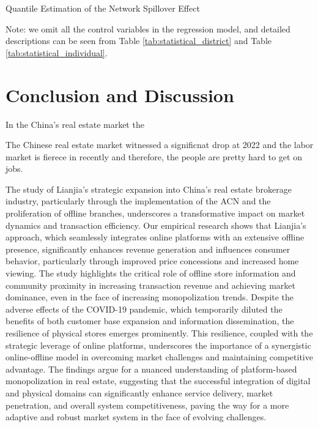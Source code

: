 \documentclass[11pt]{article}
\begin{document}
\begin{table}
  \begin{center}
    \begin{scriptsize}
      \caption{Quantile Estimation of the Network Spillover Effect}
      \label{tab:quantile_estimate_network}
      
    
    Note: we omit all the control variables in the regression model, and detailed descriptions can be seen from Table \ref{tab:statistical_district} and Table \ref{tab:statistical_individual}.
    \end{scriptsize}
  \end{center}
\end{table}


















\section{Conclusion and Discussion} \label{sec:conclusion}

In the China's real estate market the 

The Chinese real estate market witnessed a significnat drop at 2022 and the labor market is fierece in recently and therefore, the people are pretty hard to get on jobs.

The study of Lianjia's strategic expansion into China's real estate brokerage industry, particularly through the implementation of the ACN and the proliferation of offline branches, underscores a transformative impact on market dynamics and transaction efficiency. Our empirical research shows that Lianjia's approach, which seamlessly integrates online platforms with an extensive offline presence, significantly enhances revenue generation and influences consumer behavior, particularly through improved price concessions and increased home viewing. The study highlights the critical role of offline store information and community proximity in increasing transaction revenue and achieving market dominance, even in the face of increasing monopolization trends. Despite the adverse effects of the COVID-19 pandemic, which temporarily diluted the benefits of both customer base expansion and information dissemination, the resilience of physical stores emerges prominently. This resilience, coupled with the strategic leverage of online platforms, underscores the importance of a synergistic online-offline model in overcoming market challenges and maintaining competitive advantage. The findings argue for a nuanced understanding of platform-based monopolization in real estate, suggesting that the successful integration of digital and physical domains can significantly enhance service delivery, market penetration, and overall system competitiveness, paving the way for a more adaptive and robust market system in the face of evolving challenges.
\end{document}
